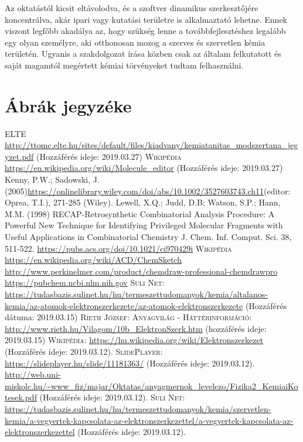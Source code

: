 \documentclass[colorlinks]{thesis-ekf}
\theoremstyle{definition}
\theoremstyle{remark}
\begin{document}
Az oktatástól kicsit eltávolodva, és a szoftver dinamikus szerkesztőjére koncentrálva, akár ipari vagy kutatási területre is alkalmaztató lehetne. Ennek viszont legfőbb akadálya az, hogy szükség lenne a továbbfejlesztéshez legalább egy olyan személyre, aki otthonosan mozog a szerves és szervetlen kémia területén. Ugyanis a szakdolgozat írása közben csak az általam felkutatott és saját magamtól megértett kémiai törvényeket tudtam felhasználni.
\chapter{Ábrák jegyzéke}
\begin{thebibliography}{1}
	 \textsc{ELTE} \url{http://ttomc.elte.hu/sites/default/files/kiadvany/kemiatanitas_modszertana_jegyzet.pdf} (Hozzáférés ideje: 2019.03.27)
	 \textsc{Wikipédia} \url{https://en.wikipedia.org/wiki/Molecule_editor} (Hozzáférés ideje: 2019.03.27)
	  Kenny, P.W.; Sadowski, J. (2005)\url{https://onlinelibrary.wiley.com/doi/abs/10.1002/3527603743.ch11}(editor: Oprea, T.I.), 271-285 (Wiley).
	 Lewell, X.Q.; Judd, D.B; Watson, S.P.; Hann, M.M. (1998) RECAP-Retrosynthetic Combinatorial Analysis Procedure: A Powerful New Technique for Identifying Privileged Molecular Fragments with Useful Applications in Combinatorial Chemistry J. Chem. Inf. Comput. Sci. 38, 511-522. \url{https://pubs.acs.org/doi/10.1021/ci970429i}
	 \textsc{Wikipédia} \url{https://en.wikipedia.org/wiki/ACD/ChemSketch}
	 \url{http://www.perkinelmer.com/product/chemdraw-professional-chemdrawpro}
	 \url{https://pubchem.ncbi.nlm.nih.gov}
	 \textsc{Suli Net}: \url{https://tudasbazis.sulinet.hu/hu/termeszettudomanyok/kemia/altalanos-kemia/az-atomok-elektronszerkezete/az-atomok-elektronszerkezete} (Hozzáférés dátuma: 2019.03.15)
	  \textsc{Rieth József: Anyagvilág - Háttérinformáció}: \url{http://www.rieth.hu/Vilagom/10b_ElektronSzerk.htm} (hozzáférés ideje: 2019.03.15)
	 \textsc{Wikipédia}: \url{https://hu.wikipedia.org/wiki/Elektronszerkezet} (Hozzáférés ideje: 2019.03.12).
	 \textsc{SlidePlayer}: \url{https://slideplayer.hu/slide/11181363/} (Hozzáférés ideje: 2019.03.12).
	 \url{http://web.uni-miskolc.hu/~www_fiz/majar/Oktatas/anyagmernok_levelezo/Fizika2_KemiaiKotesek.pdf} (Hozzáférés ideje: 2019.03.12).
	 \textsc{Suli Net}: \url{https://tudasbazis.sulinet.hu/hu/termeszettudomanyok/kemia/szervetlen-kemia/a-vegyertek-kapcsolata-az-elektronszerkezettel/a-vegyertek-kapcsolata-az-elektronszerkezettel} (Hozzáférés ideje: 2019.03.12).

\end{thebibliography}
\end{document}
